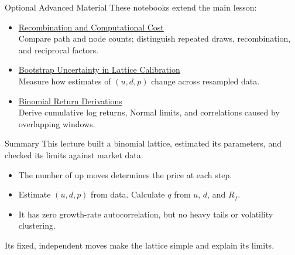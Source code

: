 \documentclass[aspectratio=169,11pt]{beamer}
\begin{document}
\begin{frame}{Optional Advanced Material}
  These notebooks extend the main lesson:

  \vspace{0.7em}
  \begin{itemize}\setlength{\itemsep}{0.8em}
    \item \href{https://github.com/varnerlab/CHEME-5660-CourseRepository-Fall-2026/blob/main/lectures/week-3/L3b/advanced/recombination/CHEME-5660-L3b-Advanced-Recombination-ComputationalCost-Fall-2026.ipynb}{Recombination and Computational Cost}\\
      Compare path and node counts; distinguish repeated draws,
      recombination, and reciprocal factors.
    \item \href{https://github.com/varnerlab/CHEME-5660-CourseRepository-Fall-2026/blob/main/lectures/week-3/L3b/advanced/calibration/CHEME-5660-L3b-Advanced-Bootstrap-LatticeCalibration-Fall-2026.ipynb}{Bootstrap Uncertainty in Lattice Calibration}\\
      Measure how estimates of $(u,d,p)$ change across resampled data.
    \item \href{https://github.com/varnerlab/CHEME-5660-CourseRepository-Fall-2026/blob/main/lectures/week-3/L3b/advanced/stylized-facts/CHEME-5660-L3b-Advanced-BinomialReturns-Derivations-Fall-2026.ipynb}{Binomial Return Derivations}\\
      Derive cumulative log returns, Normal limits, and correlations
      caused by overlapping windows.
  \end{itemize}

\end{frame}

\begin{frame}{Summary}
  This lecture built a binomial lattice, estimated its parameters, and
  checked its limits against market data.

  \vspace{0.8em}
  {\large\textbf{}}
  \vspace{0.4em}
  \begin{itemize}\setlength{\itemsep}{0.7em}
    \item \textbf{}
      The number of up moves determines the price at each step.
    \item \textbf{}
      Estimate $(u,d,p)$ from data. Calculate $q$ from $u$, $d$, and $R_f$.
    \item \textbf{}
      It has zero growth-rate autocorrelation, but no heavy tails
      or volatility clustering.
  \end{itemize}

  \vspace{0.6em}
  Its fixed, independent moves make the lattice simple and explain its limits.
\end{frame}

\end{document}
